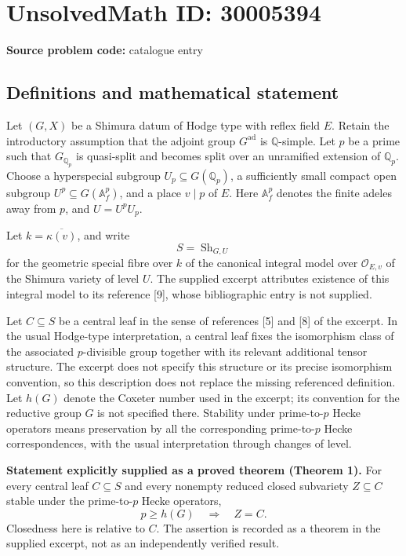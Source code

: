 \documentclass[11pt]{article}
\newcommand{\Q}{\mathbb{Q}}
\begin{document}
\section*{UnsolvedMath ID: 30005394}
\textbf{Source problem code:} catalogue entry
\subsection{Definitions and mathematical statement}
Let \((G,X)\) be a Shimura datum of Hodge type with reflex field \(E\). Retain the introductory assumption that the adjoint group \(G^{\mathrm{ad}}\) is \(\Q\)-simple. Let \(p\) be a prime such that \(G_{\Q_p}\) is quasi-split and becomes split over an unramified extension of \(\Q_p\). Choose a hyperspecial subgroup \(U_p\subseteq G(\Q_p)\), a sufficiently small compact open subgroup \(U^p\subseteq G(\mathbb A_f^p)\), and a place \(v\mid p\) of \(E\). Here \(\mathbb A_f^p\) denotes the finite adeles away from \(p\), and \(U=U^pU_p\).

Let \(k=\overline{\kappa(v)}\), and write
\[
S=\operatorname{Sh}_{G,U}
\]
for the geometric special fibre over \(k\) of the canonical integral model over \(\mathcal O_{E,v}\) of the Shimura variety of level \(U\). The supplied excerpt attributes existence of this integral model to its reference [9], whose bibliographic entry is not supplied.

Let \(C\subseteq S\) be a central leaf in the sense of references [5] and [8] of the excerpt. In the usual Hodge-type interpretation, a central leaf fixes the isomorphism class of the associated \(p\)-divisible group together with its relevant additional tensor structure. The excerpt does not specify this structure or its precise isomorphism convention, so this description does not replace the missing referenced definition. Let \(h(G)\) denote the Coxeter number used in the excerpt; its convention for the reductive group \(G\) is not specified there. Stability under prime-to-\(p\) Hecke operators means preservation by all the corresponding prime-to-\(p\) Hecke correspondences, with the usual interpretation through changes of level.

\textbf{Statement explicitly supplied as a proved theorem (Theorem 1).} For every central leaf \(C\subseteq S\) and every nonempty reduced closed subvariety \(Z\subseteq C\) stable under the prime-to-\(p\) Hecke operators,
\[
p\geq h(G)\quad\Longrightarrow\quad Z=C.
\]
Closedness here is relative to \(C\). The assertion is recorded as a theorem in the supplied excerpt, not as an independently verified result.
\end{document}
